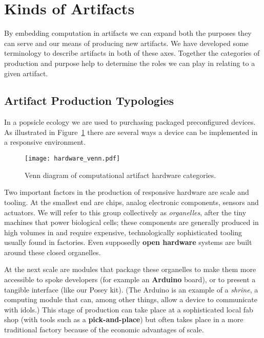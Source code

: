 \section{Kinds of Artifacts}
\label{sec:kinds_of_artifacts}
%
By embedding computation in artifacts we can expand both the purposes they can serve and our means of producing new artifacts. 
We have developed some terminology to describe artifacts in both of these axes. 
Together the categories of production and purpose help to determine the roles we can play in relating to a given artifact.

\subsection{Artifact Production Typologies}
%
In a popsicle ecology we are used to purchasing packaged preconfigured devices. As illustrated in Figure~\ref{fig:hardware_venn} there are several ways a device can be implemented in a responsive environment. 

\begin{figure}[]
  \centering
    \texttt{[image: hardware\_venn.pdf]}
  \caption{Venn diagram of computational artifact hardware categories.}
  \label{fig:hardware_venn}
\end{figure}

Two important factors in the production of responsive hardware are scale and tooling. 
At the smallest end are chips, analog electronic components, sensors and actuators. 
We will refer to this group collectively as \emph{organelles}, after the tiny machines that power biological cells; these components are generally produced in high volumes in and require expensive, technologically sophisticated tooling usually found in factories. 
Even supposedly \textbf{open hardware} systems are built around these closed organelles. 

At the next scale are modules that package these organelles to make them more accessible to spoke developers (for example an \textbf{Arduino} board), or to present a tangible interface (like our Posey kit). 
(The Arduino is an example of a \emph{shrine}, a computing module that can, among other things, allow a device to communicate with idols.) 
This stage of production can take place at a sophisticated local fab shop (with tools such as a \textbf{pick-and-place}) but often takes place in a more traditional factory because of the economic advantages of scale.

